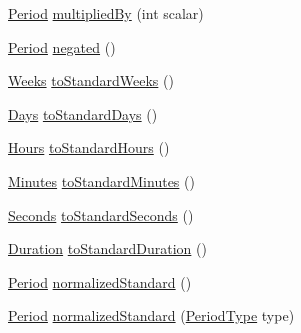 \begin{DoxyCompactItemize}
\item 
\hyperlink{classorg_1_1joda_1_1time_1_1_period}{Period} \hyperlink{classorg_1_1joda_1_1time_1_1_period_ab8a74494f98c7ef4e6304565aaae4abc}{multiplied\-By} (int scalar)
\item 
\hyperlink{classorg_1_1joda_1_1time_1_1_period}{Period} \hyperlink{classorg_1_1joda_1_1time_1_1_period_ac2714be59d3176e30713b8ad514937a3}{negated} ()
\item 
\hyperlink{classorg_1_1joda_1_1time_1_1_weeks}{Weeks} \hyperlink{classorg_1_1joda_1_1time_1_1_period_a5256b84dd767eb7cffec7384b77ea4b4}{to\-Standard\-Weeks} ()
\item 
\hyperlink{classorg_1_1joda_1_1time_1_1_days}{Days} \hyperlink{classorg_1_1joda_1_1time_1_1_period_ad08a024261151274cb586efbfe402fb8}{to\-Standard\-Days} ()
\item 
\hyperlink{classorg_1_1joda_1_1time_1_1_hours}{Hours} \hyperlink{classorg_1_1joda_1_1time_1_1_period_a8b9a4fcd1c41a89998c9eac0109cf3fb}{to\-Standard\-Hours} ()
\item 
\hyperlink{classorg_1_1joda_1_1time_1_1_minutes}{Minutes} \hyperlink{classorg_1_1joda_1_1time_1_1_period_a894bec791e0874d7c2e9078e1a5b2bb8}{to\-Standard\-Minutes} ()
\item 
\hyperlink{classorg_1_1joda_1_1time_1_1_seconds}{Seconds} \hyperlink{classorg_1_1joda_1_1time_1_1_period_a07e7b881b966f7796e3721e86cec2345}{to\-Standard\-Seconds} ()
\item 
\hyperlink{classorg_1_1joda_1_1time_1_1_duration}{Duration} \hyperlink{classorg_1_1joda_1_1time_1_1_period_ab7d50ac9ec49beb35dd7cd25dd3f8b87}{to\-Standard\-Duration} ()
\item 
\hyperlink{classorg_1_1joda_1_1time_1_1_period}{Period} \hyperlink{classorg_1_1joda_1_1time_1_1_period_acf00ea515b2a9427ba683cc7bd0d46a0}{normalized\-Standard} ()
\item 
\hyperlink{classorg_1_1joda_1_1time_1_1_period}{Period} \hyperlink{classorg_1_1joda_1_1time_1_1_period_a03142f76ee64b2b79dbb4b90023bd0e3}{normalized\-Standard} (\hyperlink{classorg_1_1joda_1_1time_1_1_period_type}{Period\-Type} type)
\end{DoxyCompactItemize}
